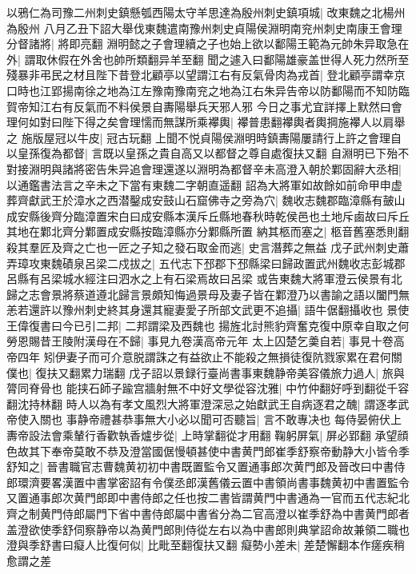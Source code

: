 以鴉仁為司豫二州刺史鎮懸瓠西陽太守羊思達為殷州刺史鎮項城|{
	改東魏之北楊州為殷州}
八月乙丑下詔大舉伐東魏遣南豫州刺史貞陽侯淵明南兖州刺史南康王會理分督諸將|{
	將即亮翻}
淵明懿之子會理續之子也始上欲以鄱陽王範為元帥朱异取急在外|{
	謂取休假在外舍也帥所類翻异羊至翻}
聞之遽入曰鄱陽雄豪盖世得人死力然所至殘暴非弔民之材且陛下昔登北顧亭以望謂江右有反氣骨肉為戎首|{
	登北顧亭謂幸京口時也江郢揚南徐之地為江左豫南豫南兖之地為江右朱异告帝以防鄱陽而不知防臨賀帝知江右有反氣而不料侯景自夀陽舉兵天邪人邪}
今日之事尤宜詳擇上默然曰會理何如對曰陛下得之矣會理懦而無謀所乘襻輿|{
	襻普患翻襻輿者輿掆施襻人以肩舉之}
施版屋冠以牛皮|{
	冠古玩翻}
上聞不悦貞陽侯淵明時鎮夀陽屢請行上許之會理自以皇孫復為都督|{
	言既以皇孫之貴自高又以都督之尊自處復扶又翻}
自淵明已下殆不對接淵明與諸將密告朱异追會理還遂以淵明為都督辛未高澄入朝於鄴固辭大丞相|{
	以通鑑書法言之辛未之下當有東魏二字朝直遥翻}
詔為大將軍如故餘如前命甲申虚葬齊獻武王於漳水之西潜鑿成安鼓山石窟佛寺之旁為穴|{
	魏收志魏郡臨漳縣有皷山成安縣後齊分臨漳置宋白曰成安縣本漢斥丘縣地春秋時乾侯邑也土地斥鹵故曰斥丘其地在鄴北齊分鄴置成安縣按臨漳縣亦分鄴縣所置}
納其柩而塞之|{
	柩音舊塞悉則翻}
殺其羣匠及齊之亡也一匠之子知之發石取金而逃|{
	史言潛葬之無益}
戊子武州刺史蕭弄璋攻東魏磧泉呂梁二戍拔之|{
	五代志下邳郡下邳縣梁曰歸政置武州魏收志彭城郡呂縣有呂梁城水經注曰泗水之上有石梁焉故曰呂梁}
或告東魏大將軍澄云侯景有北歸之志會景將蔡道遵北歸言景頗知悔過景母及妻子皆在鄴澄乃以書諭之語以闔門無恙若還許以豫州刺史終其身還其寵妻愛子所部文武更不追攝|{
	語牛倨翻攝收也}
景使王偉復書曰今已引二邦|{
	二邦謂梁及西魏也}
揚旌北討熊豹齊奮克復中原幸自取之何勞恩賜昔王陵附漢母在不歸|{
	事見九卷漢高帝元年}
太上囚楚乞羮自若|{
	事見十卷高帝四年}
矧伊妻子而可介意脱謂誅之有益欲止不能殺之無損徒復阬戮家累在君何關僕也|{
	復扶又翻累力瑞翻}
戊子詔以景録行臺尚書事東魏静帝美容儀旅力過人|{
	旅與膂同脊骨也}
能挟石師子踰宫牆射無不中好文學從容沈雅|{
	中竹仲翻好呼到翻從千容翻沈持林翻}
時人以為有孝文風烈大將軍澄深忌之始獻武王自病逐君之醜|{
	謂逐孝武帝使入關也}
事静帝禮甚恭事無大小必以聞可否聽旨|{
	言不敢專决也}
每侍晏俯伏上夀帝設法會乘輦行香歡執香爐步從|{
	上時掌翻從才用翻}
鞠躬屏氣|{
	屏必郢翻}
承望顔色故其下奉帝莫敢不恭及澄當國倨慢頓甚使中書黄門郎崔季舒察帝動静大小皆令季舒知之|{
	晉書職官志曹魏黄初初中書既置監令又置通事郎次黄門郎及晉改曰中書侍郎環濟要畧漢置中書掌密詔有令僕丞郎漢舊儀云置中書領尚書事魏黄初中書置監令又置通事郎次黄門郎即中書侍郎之任也按二書皆謂黄門中書通為一官而五代志紀北齊之制黄門侍郎屬門下省中書侍郎屬中書省分為二官高澄以崔季舒為中書黄門郎者盖澄欲使季舒伺察静帝以為黄門郎則侍從左右以為中書郎則典掌詔命故兼領二職也}
澄與季舒書曰癡人比復何似|{
	比毗至翻復扶又翻}
癡勢小差未|{
	差楚懈翻本作瘥疾稍愈謂之差}
